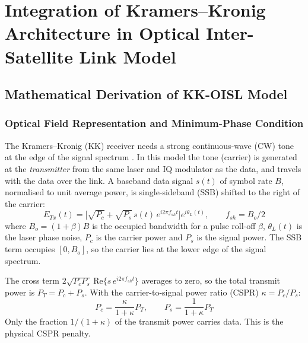 \chapter{Integration of Kramers--Kronig Architecture in Optical Inter-Satellite Link Model}

\section{Mathematical Derivation of KK-OISL Model}

\subsection{Optical Field Representation and Minimum-Phase Condition}

The Kramers--Kronig (KK) receiver needs a strong continuous-wave (CW) tone at the edge of the signal spectrum \cite{mecozzi2016}. In this model the tone (carrier) is generated at the \emph{transmitter} from the same laser and IQ modulator as the data, and travels with the data over the link. A baseband data signal $s(t)$ of symbol rate $B$, normalised to unit average power, is single-sideband (SSB) shifted to the right of the carrier:
\begin{equation}
E_{Tx}(t)=\Big[\sqrt{P_c}+\sqrt{P_s}\,s(t)\,e^{i2\pi f_{sh}t}\Big]e^{i\theta_L(t)},\qquad f_{sh}=B_o/2
\end{equation}
where $B_o=(1+\beta)B$ is the occupied bandwidth for a pulse roll-off $\beta$, $\theta_L(t)$ is the laser phase noise, $P_c$ is the carrier power and $P_s$ is the signal power. The SSB term occupies $[0,B_o]$, so the carrier lies at the lower edge of the signal spectrum.

The cross term $2\sqrt{P_cP_s}\,\mathrm{Re}\{s\,e^{i2\pi f_{sh}t}\}$ averages to zero, so the total transmit power is $P_T=P_c+P_s$. With the carrier-to-signal power ratio (CSPR) $\kappa=P_c/P_s$:
\begin{equation}
P_c=\frac{\kappa}{1+\kappa}P_T,\qquad P_s=\frac{1}{1+\kappa}P_T
\end{equation}
Only the fraction $1/(1+\kappa)$ of the transmit power carries data. This is the physical CSPR penalty.

